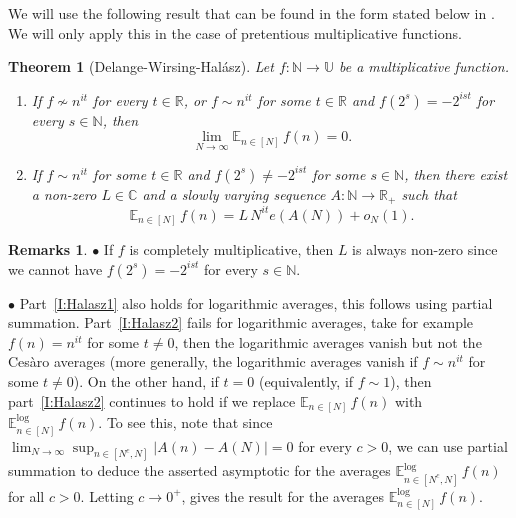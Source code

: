 \documentclass[11pt]{amsart}
\newtheorem{theorem}[lemma]{Theorem}
\theoremstyle{definition}
\newtheorem*{remarks}{Remarks}
\newcommand{\lE}{\mathbb{E}^{\log}}
\newcommand{\C}{{\mathbb C}}
\newcommand{\E}{{\mathbb E}}
\newcommand{\N}{{\mathbb N}}
\newcommand{\R}{{\mathbb R}}
\newcommand{\U}{{\mathbb U}}
\begin{document}
 

We will use the following result that can be found in the form stated below in \cite[Theorems~6.2 and 6.3]{E79}. We will only apply this in the case of pretentious multiplicative functions.
\begin{theorem}[Delange-Wirsing-Hal\'asz]\label{T:Halasz}
	Let $f\colon \N\to \U$ be a multiplicative function.
\begin{enumerate}
	\item\label{I:Halasz1}  If $f\not\sim n^{it}$ for every $t\in \R$, or $f\sim n^{it}$ for some $t\in \R$  and $f(2^s)=-2^{ist}$ for every $s\in \N$, then
	$$
	\lim_{N\to\infty} \E_{n\in[N]}\, f(n)=0.
	$$
	
	\item \label{I:Halasz2} If $f\sim n^{it}$ for some $t\in \R$ and $f(2^s)\neq -2^{ist}$ for some $s\in \N$, then there exist a non-zero  $L\in \C$  and a slowly varying sequence $A\colon \N\to \R_+$ such that
	$$
	\E_{n\in[N]}\, f(n)=L\, N^{it} e(A(N)) +o_N(1).
	$$
\end{enumerate}
\end{theorem}
\begin{remarks}
	$\bullet$ If $f$ is completely multiplicative, then $L$ is always non-zero since we cannot have  $f(2^s)=-2^{ist}$ for every $s\in \N$.
	
	$\bullet$ Part~\eqref{I:Halasz1} also holds for logarithmic averages, this follows using partial summation. Part~\eqref{I:Halasz2}   fails for logarithmic averages, take for example  $f(n)=n^{it}$ for some $t\neq 0$, then the logarithmic averages vanish but not the Ces\`aro averages (more generally, the logarithmic averages vanish if $f\sim n^{it}$ for some  $t\neq 0$).
	On the other hand, if $t=0$ (equivalently, if  $f\sim 1$), then  part~\eqref{I:Halasz2}
	 continues to  hold
	if  we replace $\E_{n\in [N]}\, f(n)$ with $\lE_{n\in [N]}\, f(n)$.
To see this, note that since 	
		$\lim_{N\to\infty}  \sup_{n\in [N^c,N]}|A(n)-A(N)|=0$ for every $c>0$, we can use partial summation to deduce the asserted asymptotic for the averages $\lE_{n\in[N^c,N]}\, f(n)$ for all $c>0$. Letting $c\to 0^+$,
 gives the  result for  the averages $\lE_{n\in [N]}\, f(n)$.
\end{remarks}
\end{document}
